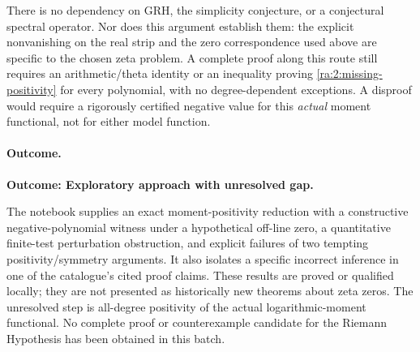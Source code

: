 \documentclass[11pt]{article}
\begin{document}
There is no dependency on GRH, the simplicity conjecture, or a conjectural
spectral operator. Nor does this argument establish them: the explicit
nonvanishing on the real strip and the zero correspondence used above are
specific to the chosen zeta problem. A complete proof along this route still
requires an arithmetic/theta identity or an inequality proving
\eqref{ra:2:missing-positivity} for every polynomial, with no degree-dependent
exceptions. A disproof would require a rigorously certified negative value
for this \emph{actual} moment functional, not for either model function.

\paragraph{Outcome.}
\textbf{Outcome: Exploratory approach with unresolved gap.}

The notebook supplies an exact moment-positivity reduction with a constructive
negative-polynomial witness under a hypothetical off-line zero, a quantitative
finite-test perturbation obstruction, and explicit failures of two tempting
positivity/symmetry arguments. It also isolates a specific incorrect inference
in one of the catalogue's cited proof claims. These results are proved or
qualified locally; they are not presented as historically new theorems about
zeta zeros. The unresolved step is all-degree positivity of the actual
logarithmic-moment functional. No complete proof or counterexample candidate
for the Riemann Hypothesis has been obtained in this batch.
\end{document}
